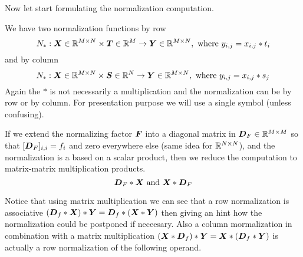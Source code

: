 \documentclass[acmsmall]{acmart}
\begin{document}
Now let start formulating the normalization computation.

\begin{definition}
  We have two normalization functions by row 
  \begin{equation}
    N_*: {\boldsymbol X}\in\mathbb{R}^{M\times N} \times {\boldsymbol T}\in \mathbb{R}^M \rightarrow {\boldsymbol Y}
    \in \mathbb{R}^{M\times N}, \text{ where } y_{i,j} = x_{i,j}*t_i
  \end{equation}
  and by column
  \begin{equation}
    N_*: {\boldsymbol X}\in\mathbb{R}^{M\times N} \times  {\boldsymbol S}\in \mathbb{R}^N \rightarrow {\boldsymbol Y}
    \in \mathbb{R}^{M\times N}, \text{ where } y_{i,j} = x_{i,j}*s_j
  \end{equation}
  Again the $*$ is not necessarily a multiplication and the
  normalization can be by row or by column. For presentation purpose
  we will use a single symbol (unless confusing).
\end{definition}

If we extend the normalizing factor ${\boldsymbol F}$ into a diagonal matrix in
${\boldsymbol D}_F \in \mathbb{R}^{M\times M}$ so that $[{\boldsymbol D}_F]_{i,i} = f_i$ and
zero everywhere else (same idea for $\mathbb{R}^{N\times N}$), and the
normalization is a based on a scalar product, then we reduce the
computation to matrix-matrix multiplication products. 
\begin{equation}
  {\boldsymbol D}_F * {\boldsymbol X} \text{ and } {\boldsymbol X} * {\boldsymbol D}_F
\end{equation}

Notice that using matrix multiplication we can see that a row
normalization is associative $({\boldsymbol D}_f * {\boldsymbol X}) * {\boldsymbol Y} = {\boldsymbol D}_f
* ({\boldsymbol X} * {\boldsymbol Y})$ then giving an hint how the normalization could
be postponed if neceesary.  Also a column mormalization in combination
with a matrix multiplication $({\boldsymbol X}* {\boldsymbol D}_f) * {\boldsymbol Y} = {\boldsymbol X}*
({\boldsymbol D}_f * {\boldsymbol Y})$ is actually a row normalization of the following
operand.
\end{document}
